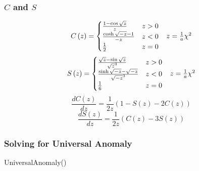 \subsubsection{$C$ and $S$}
\begin{equation}
    \label{stumpf_C}
    \begin{array}{c c}
        C\left(z\right) =
        \begin{cases}
            \frac{1-\cos{\sqrt{z}}}{z} & z > 0 \\
            \frac{\cosh{\sqrt{-z}}-1}{-z} & z < 0 \\
            \frac{1}{2} & z = 0
        \end{cases}
    &
    z = \frac{1}{a}\chi^2
    \end{array}
\end{equation}
\begin{equation}
    \label{stumpf_S}
    \begin{array}{c c}
        S\left(z\right) =
        \begin{cases}
            \frac{\sqrt{z}-\sin{\sqrt{z}}}{\sqrt{z}^3} & z > 0 \\
            \frac{\sinh{\sqrt{-z}}-\sqrt{-z}}{\sqrt{-z}^3} & z < 0 \\
            \frac{1}{6} & z = 0
        \end{cases}
    &
    z = \frac{1}{a}\chi^2
    \end{array}
\end{equation}
\begin{equation}
    \label{stumpf_C_prime}
    \frac{dC\left(z\right)}{dz}=\frac{1}{2z}\left(1-S\left(z\right)-2C\left(z\right)\right)
\end{equation}
\begin{equation}
    \label{stumpf_S_prime}
    \frac{dS\left(z\right)}{dz}=\frac{1}{2z}\left(C\left(z\right)-3S\left(z\right)\right)
\end{equation}

\subsubsection{Solving for Universal Anomaly}
\begin{function}
    \DontPrintSemicolon
    \caption{UniversalAnomaly()}
\end{function}

